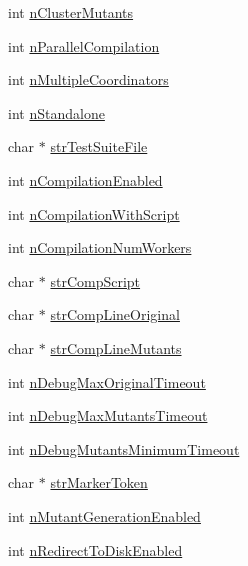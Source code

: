 \begin{DoxyCompactItemize}
int \hyperlink{structT__stIniValues_a0894f6830a07c5a2abef86eba6d21ad4}{n\-Cluster\-Mutants}
\item 
int \hyperlink{structT__stIniValues_a99916a5b870f3013258fb4d94dd267ee}{n\-Parallel\-Compilation}
\item 
int \hyperlink{structT__stIniValues_a3a381877bb58f342dde196a92a758dbe}{n\-Multiple\-Coordinators}
\item 
int \hyperlink{structT__stIniValues_a1da1d562517d22f3222f4e7ee6d5e796}{n\-Standalone}
\item 
char $\ast$ \hyperlink{structT__stIniValues_a3effe0bd84fa5aeee8f4c3f692aa8bfd}{str\-Test\-Suite\-File}
\item 
int \hyperlink{structT__stIniValues_aa1eaa1b7d87ff2a0f2ec8caec8031c60}{n\-Compilation\-Enabled}
\item 
int \hyperlink{structT__stIniValues_a146c389d29426313ef81da2437b1d3d0}{n\-Compilation\-With\-Script}
\item 
int \hyperlink{structT__stIniValues_a444ac168ec41e6247a3b067d072b1d14}{n\-Compilation\-Num\-Workers}
\item 
char $\ast$ \hyperlink{structT__stIniValues_a36dc23b7fe03594fd63814845a4e1a7f}{str\-Comp\-Script}
\item 
char $\ast$ \hyperlink{structT__stIniValues_aa0a14b65aed12b004b3573400c9dca6c}{str\-Comp\-Line\-Original}
\item 
char $\ast$ \hyperlink{structT__stIniValues_af9f6e7aaa953f711b273f3db16b3b890}{str\-Comp\-Line\-Mutants}
\item 
int \hyperlink{structT__stIniValues_a2e36a8f8b5ef4a0fb44e500769b557ee}{n\-Debug\-Max\-Original\-Timeout}
\item 
int \hyperlink{structT__stIniValues_add6f1a10197d4eac1fff112415132dae}{n\-Debug\-Max\-Mutants\-Timeout}
\item 
int \hyperlink{structT__stIniValues_a49c0c8b9a860bd7c184b048151fcab92}{n\-Debug\-Mutants\-Minimum\-Timeout}
\item 
char $\ast$ \hyperlink{structT__stIniValues_ac65031fbdca94a97851ea1d067dc5f13}{str\-Marker\-Token}
\item 
int \hyperlink{structT__stIniValues_ad8464f5bd317d855026690e7145cc15a}{n\-Mutant\-Generation\-Enabled}
\item 
int \hyperlink{structT__stIniValues_a45462c428e0bb03d4de87064d2ce6b95}{n\-Redirect\-To\-Disk\-Enabled}
\end{DoxyCompactItemize}


